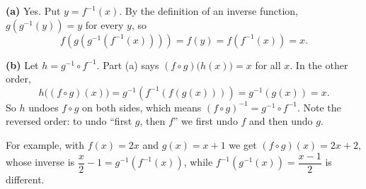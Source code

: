 \textbf{(a)} Yes. Put $y=f^{-1}(x)$. By the definition of an inverse function, $g\left(g^{-1}(y)\right)=y$ for every $y$, so
\[f\left(g\left(g^{-1}\left(f^{-1}(x)\right)\right)\right)=f(y)=f\left(f^{-1}(x)\right)=\boxed{x}.\]

\textbf{(b)} Let $h=g^{-1}\circ f^{-1}$. Part (a) says $(f\circ g)\bigl(h(x)\bigr)=x$ for all $x$. In the other order,
\[h\bigl((f\circ g)(x)\bigr)=g^{-1}\left(f^{-1}\left(f\left(g(x)\right)\right)\right)=g^{-1}\left(g(x)\right)=x .\]
So $h$ undoes $f\circ g$ on both sides, which means $(f\circ g)^{-1}=g^{-1}\circ f^{-1}$. Note the reversed order: to undo ``first $g$, then $f$'' we first undo $f$ and then undo $g$.

For example, with $f(x)=2x$ and $g(x)=x+1$ we get $(f\circ g)(x)=2x+2$, whose inverse is $\dfrac {x}{2}-1=g^{-1}\left(f^{-1}(x)\right)$, while $f^{-1}\left(g^{-1}(x)\right)=\dfrac{x-1}{2}$ is different.
